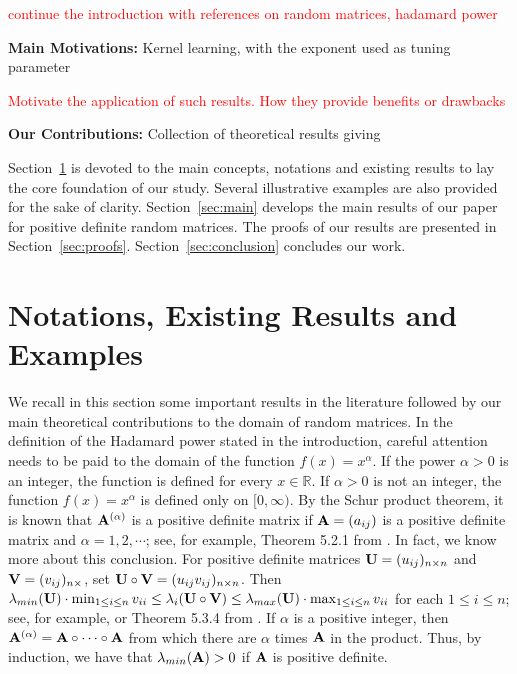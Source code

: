 \documentclass[conference,letterpaper]{IEEEtran}
\numberwithin{equation}{section}
\newcommand{\lbl}{\label}
\newcommand{\bd}{\bold}
\begin{document}
\textcolor{red}{continue the introduction with references on random matrices, hadamard power}

\textbf{Main Motivations: }
Kernel learning, with the exponent used as tuning parameter

\textcolor{red}{Motivate the application of such results. How they provide benefits or drawbacks}

\textbf{Our Contributions: }
Collection of theoretical results giving 


Section~\ref{sec:notations} is devoted to the main concepts, notations and existing results to lay the core foundation of our study.
Several illustrative examples are also provided for the sake of clarity.
Section~\ref{sec:main} develops the main results of our paper for positive definite random matrices.
The proofs of our results are presented in Section~\ref{sec:proofs}.
Section~\ref{sec:conclusion} concludes our work.

\section{Notations, Existing Results and Examples}\lbl{sec:notations}
We recall in this section some important results in the literature followed by our main theoretical contributions to the domain of random matrices.
In the definition of the Hadamard power stated in the introduction, careful attention needs to be paid to the domain of the function $f(x)=x^{\alpha}$. 
If the power $\alpha>0$ is an integer, the function is defined for every $x\in \mathbb{R}.$ If $\alpha>0$ is not an integer, the function $f(x)=x^{\alpha}$ is defined only on $[0, \infty).$ By the Schur product theorem, it is known that $\bd{A}^{(\alpha)}$ is a positive definite matrix if $\bd{A}=(a_{ij})$ is a positive definite matrix and $\alpha =1,2, \cdots$; see, for example, Theorem 5.2.1 from \cite{horn_johnson_1991}. In fact, we know more about this conclusion. For positive definite matrices $\bd{U}=(u_{ij})_{n\times n}$ and $\bd{V}=(v_{ij})_{n\times}$, set $\bd{U}\circ \bd{V}=(u_{ij}v_{ij})_{n\times n}$. Then  $\lambda_{min}(\bd{U})\cdot\min_{1\leq i \leq n}{v_{ii}}\leq \lambda_i(\bd{U}\circ \bd{V})\leq \lambda_{max}(\bd{U})\cdot\max_{1\leq i \leq n}{v_{ii}}$ for each $1\leq i \leq n$; see, for example, \cite{schur1911bemerkungen} or Theorem 5.3.4 from \cite{horn_johnson_1991}. If $\alpha$ is a positive integer, then  $\bd{A}^{(\alpha)}=\bd{A}\circ\cdots\circ\bd{A}$ from which there are $\alpha$ times $\bd{A}$ in the product. Thus, by induction, we have that $\lambda_{min}(\bd{A})>0$ if $\bd{A}$ is positive definite.
\end{document}
